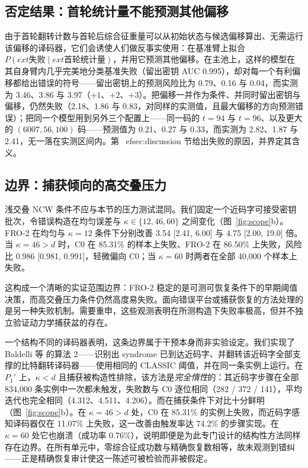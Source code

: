 \documentclass[UTF8,a4paper,10pt,twocolumn]{ctexart}
\begin{document}
\subsection{否定结果：首轮统计量不能预测其他偏移}\label{sec:counterfactual}

由于首轮翻转计数与首轮后综合征重量可以从初始状态与候选偏移算出、无需运行该偏移的译码器，它们会诱使人们做反事实使用：在基准臂上拟合 $P(	ext{失败}\mid	ext{首轮统计量})$，并用它预测其他偏移。在主池上，这样的模型在其自身臂内几乎完美地分类基准失败（留出密钥 AUC 0.995），却对每一个有利偏移都给出错误的符号——留出密钥上的预测风险比为 0.79、0.16 与 0.04，而实测为 3.46、3.86 与 3.97（$+1$、$+2$、$+3$）。把偏移一并作为条件、并同时留出密钥与偏移，仍然失败（2.18、1.86 与 0.83，对同样的实测值，且最大偏移的方向预测错误）；把同一个模型用到另外三个配置上——同一码的 $t=94$ 与 $t=96$、以及更大的 $(6007,56,100)$ 码——预测值为 0.21、0.27 与 0.33，而实测为 2.82、1.87 与 2.41，无一落在实测区间内。第~
ef{sec:discussion} 节给出失败的原因，并界定其含义。

\subsection{边界：捕获倾向的高交叠压力}\label{sec:boundary}

浅交叠 NCW 条件不应与本节的压力测试混同。我们固定一个近码字可接受密钥批次，令错误构造在均匀误差与 $\kappa\in\{12,46,60\}$ 之间变化（图~\ref{fig:scope}b）。FRO-2 在均匀与 $\kappa=12$ 条件下分别改善 3.54 [2.41, 6.00] 与 4.75 [2.00, 19.0] 倍。当 $\kappa=46>d$ 时，C0 在 85.31\% 的样本上失败、FRO-2 在 86.50\% 上失败，风险比 0.986 [0.981, 0.991]，轻微偏向 C0；当 $\kappa=60$ 时两者在全部 40{,}000 个样本上失败。

这构成一个清晰的实证范围边界：FRO-2 稳定的是可测可恢复条件下的早期阈值决策，而高交叠压力条件仍然高度易失败。面向错误平台或捕获恢复的方法处理的是另一种失败机制\cite{baldelli2026ncw,santini2026flip}。需要重申，这些观测表明在所测构造下失败率极高，但并不独立验证动力学捕获盆的存在。

一个结构不同的译码器表明，这条边界属于干预本身而非实验设定。我们实现了 Baldelli 等\cite{baldelli2026ncw} 的算法 2——识别出 syndrome 已到达近码字、并翻转该近码字全部支撑的比特翻转译码器——使用相同的 CLASSIC 阈值，并在同一条实例上运行。在 $P_1'$ 上，$\kappa<d$ 且捕获被构造性排除，该方法是\emph{完全惰性}的：其近码字步骤在全部 834{,}000 条实例中一次都未触发，失败数与 C0 逐位相同（282 / 372 / 141），平均迭代也完全相同（4.312、4.511、4.206）。而在捕获条件下对比十分鲜明（图~\ref{fig:scope}b）。在 $\kappa=46>d$ 处，C0 在 85.31\% 的实例上失败，而近码字感知译码器仅在 11.07\% 上失败，这一改善由触发率达 74.2\% 的步骤实现。在 $\kappa=60$ 处它也崩溃（成功率 0.76\%），说明即便是为此专门设计的结构性方法同样存在边界。在所有单元中，零综合征成功数与精确恢复数相等，故未观测到错纠——正是精确恢复审计使这一陈述可被检验而非被假定。
\end{document}
